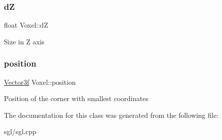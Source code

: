 \subsubsection{\texorpdfstring{dZ}{dZ}}
{\footnotesize\ttfamily float Voxel\+::dZ}

Size in Z axis \mbox{\label{class_voxel_a92eee751b0eaf4d10e4b5aa8f4f749ef}} 
\subsubsection{\texorpdfstring{position}{position}}
{\footnotesize\ttfamily \hyperlink{class_vector3f}{Vector3f} Voxel\+::position}

Position of the corner with smallest coordinates 

The documentation for this class was generated from the following file\+:\begin{DoxyCompactItemize}
\item 
sgl/sgl.\+cpp\end{DoxyCompactItemize}
